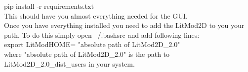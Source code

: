 \documentclass[14pt]{article}
\begin{document}
pip install -r requirements.txt\\

This should have you almost everything needed for the GUI.\\

Once you have everything installed you need to add the LitMod2D to you your path. To do this simply open ~/.bashsrc and add following lines:\\
export LitModHOME= "absolute path of LitMod2D\_2.0" \\
where "absolute path of LitMod2D\_2.0" is the path to LitMod2D\_2.0\_dist\_users in your system.


 
  





 

                     
\end{document}
